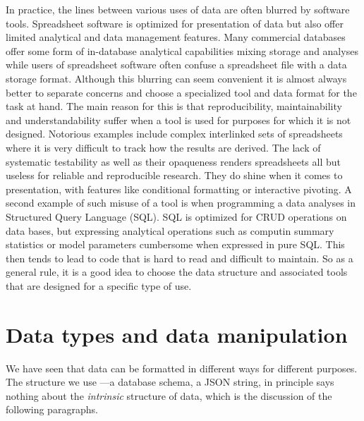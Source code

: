 In practice, the lines between various uses of data are often blurred by
software tools. Spreadsheet software is optimized for presentation of data but
also offer limited analytical and data management features. Many commercial
databases offer some form of in-database analytical capabilities mixing storage
and analyses while users of spreadsheet software often confuse a spreadsheet
file with a data storage format. Although this blurring can seem convenient it
is almost always better to separate concerns and choose a specialized tool and
data format for the task at hand. The main reason for this is that
reproducibility, maintainability and understandability suffer when a tool is
used for purposes for which it is not designed.  Notorious examples include
complex interlinked sets of spreadsheets where it is very difficult to track
how the results are derived. The lack of systematic testability as well as
their opaqueness renders spreadsheets all but useless for reliable and
reproducible research. They do shine when it comes to presentation, with
features like conditional formatting or interactive pivoting. A second example
of such misuse of a tool is when programming a data analyses in Structured Query
Language (SQL). SQL is optimized for CRUD operations on data bases, but
expressing analytical operations such as computin summary statistics or
model parameters cumbersome when expressed in pure SQL. This then tends to lead
to code that is hard to read and difficult to maintain. So as a general rule,
it is a good idea to choose the data structure and associated tools that are
designed for a specific type of use. 





\section{Data types and data manipulation}
\label{sect:faces:types}
We have seen that data can be formatted in different ways for different
purposes.  The structure we use ---a database schema, a JSON string, in principle
says nothing about the \emph{intrinsic} structure of data, which is the
discussion of the following paragraphs.

